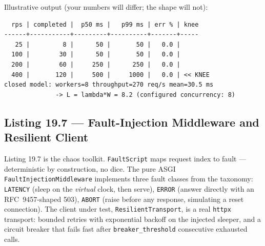 Illustrative output (your numbers will differ; the shape will not):

\begin{verbatim}
  rps | completed |  p50 ms |   p99 ms | err % | knee
------+-----------+---------+----------+-------+-----
   25 |         8 |      50 |       50 |   0.0 |
  100 |        30 |      50 |       50 |   0.0 |
  200 |        60 |     250 |      250 |   0.0 |
  400 |       120 |     500 |     1000 |   0.0 | << KNEE
closed model: workers=8 throughput=270 req/s mean=30.5 ms
              -> L = lambda*W = 8.2 (configured concurrency: 8)
\end{verbatim}

\subsection{Listing 19.7 --- Fault-Injection Middleware and Resilient Client}
\label{sec:ch19-listing-faults}

Listing 19.7 is the chaos toolkit. \texttt{FaultScript} maps
request index to fault --- deterministic by construction, no dice. The pure
ASGI \texttt{FaultInjectionMiddleware} implements three fault classes from
the taxonomy: \texttt{LATENCY} (sleep on the \emph{virtual} clock, then
serve), \texttt{ERROR} (answer directly with an RFC~9457-shaped 503),
\texttt{ABORT} (raise before any response, simulating a reset connection).
The client under test, \texttt{ResilientTransport}, is a real
\texttt{httpx} transport: bounded retries with exponential backoff on the
injected sleeper, and a circuit breaker that fails fast after
\texttt{breaker\_threshold} consecutive exhausted calls.

